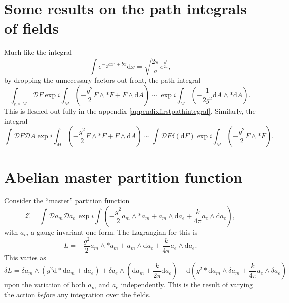 \documentclass{article}
\begin{document}
\section{Some results on the path integrals of fields}
Much like the integral
\begin{equation}
    \int e^{-\frac{1}{2}ax^{2}+bx}\mathrm{d}x = \sqrt{\frac{2\pi}{a}}e^{\frac{b^{2}}{2a}},
\end{equation}
by dropping the unnecessary factors out front, the path integral 
\begin{equation}
    \boxed{
    \int_{\mathfrak{g}\times M}\mathcal{D}F\exp i \int_{M}\left(-\frac{g^{2}}{2}F\wedge * F + F\wedge \mathrm{d}A \right)\sim \exp i \int_{M}\left(-\frac{1}{2g^{2}}\mathrm{d}A\wedge *\mathrm{d}A\right).
    }
\end{equation}
This is fleshed out fully in the appendix \ref{appendixfirstpathintegral}. Similarly, the integral
\begin{equation}
    \boxed{
    \int \mathcal{D}F\mathcal{D}A\exp i \int_{M}\left(-\frac{g^{2}}{2}F\wedge * F + F\wedge \mathrm{d}A \right)\sim \int \mathcal{D}F\delta\left(\mathrm{d}F \right)\exp i \int_{M}\left(-\frac{g^{2}}{2}F\wedge * F \right).
    }
\end{equation}

\section{Abelian master partition function}
Consider the ``master'' partition function
\begin{equation}
    \mathcal{Z} = \int \mathcal{D}a_{m}\mathcal{D}a_{e}\,\exp i \int \left( -\frac{g^{2}}{2}a_{m}\wedge *a_{m} + a_{m}\wedge \mathrm{d}a_{e} + \frac{k}{4\pi}a_{e}\wedge \mathrm{d}a_{e} \right),
\end{equation}
with $a_{m}$ a gauge invariant one-form. The Lagrangian for this is
\begin{equation}
    L =  -\frac{g^{2}}{2}a_{m}\wedge *a_{m} + a_{m}\wedge \mathrm{d}a_{e} + \frac{k}{4\pi}a_{e}\wedge \mathrm{d}a_{e}.
\end{equation}
This varies as
\begin{equation}
    \delta L = \delta a_{m}\wedge \left(g^{2}\mathrm{d}*\mathrm{d}a_{m} + \mathrm{d}a_{e}\right) + \delta a_{e}\wedge \left(\mathrm{d}a_{m} + \frac{k}{2\pi}\mathrm{d}a_{e}\right) + \mathrm{d}\left(g^{2}*\mathrm{d}a_{m}\wedge \delta a_{m} + \frac{k}{4\pi}a_{e}\wedge \delta a_{e}\right)
\end{equation}
upon the variation of both $a_{m}$ and $a_{e}$ independently. This is the result of varying the action \textit{before} any integration over the fields. 
\end{document}
